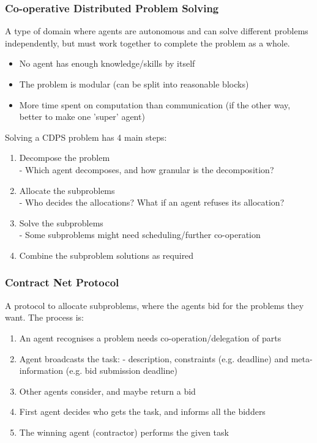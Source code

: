 \subsubsection{Co-operative Distributed Problem Solving}
A type of domain where agents are autonomous and can solve different problems independently, but must work together to complete the problem as a whole.
\begin{itemize}
    \item No agent has enough knowledge/skills by itself
    \item The problem is modular (can be split into reasonable blocks)
    \item More time spent on computation than communication (if the other way, better to make one 'super' agent)
\end{itemize}

Solving a CDPS problem has 4 main steps:
\begin{enumerate}
    \item Decompose the problem \\ \quad \quad - Which agent decomposes, and how granular is the decomposition?
    \item Allocate the subproblems \\ \quad \quad - Who decides the allocations? What if an agent refuses its allocation?
    \item Solve the subproblems \\ \quad \quad - Some subproblems might need scheduling/further co-operation
    \item Combine the subproblem solutions as required
\end{enumerate}

\subsubsection{Contract Net Protocol}
A protocol to allocate subproblems, where the agents bid for the problems they want. The process is:
\begin{enumerate}
    \item An agent recognises a problem needs co-operation/delegation of parts
    \item Agent broadcasts the task: - description, constraints (e.g. deadline) and meta-information (e.g. bid submission deadline)
    \item Other agents consider, and maybe return a bid
    \item First agent decides who gets the task, and informs all the bidders
    \item The winning agent (contractor) performs the given task
\end{enumerate}

